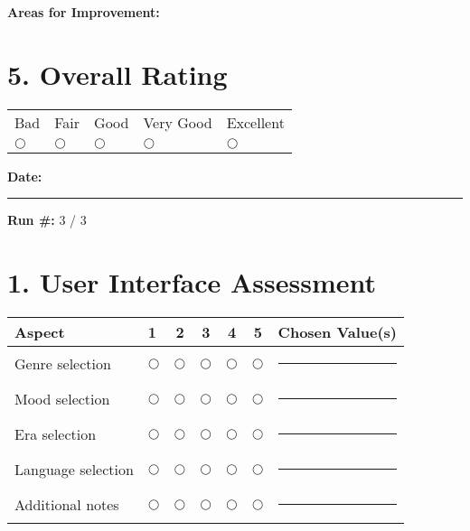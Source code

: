 \documentclass[11pt]{article}
\begin{document}
  \noindent \textbf{Areas for Improvement:}
  \vspace{2cm}

  \section*{5. Overall Rating}
  \vspace{0.5cm}
  \begin{center}
    \begin{tabular}{p{1.8cm}p{1.8cm}p{1.8cm}p{1.8cm}p{1.8cm}}
      Bad & Fair & Good & Very Good & Excellent\\
      $\bigcirc$ & $\bigcirc$ & $\bigcirc$ & $\bigcirc$ & $\bigcirc$\\
    \end{tabular}
  \end{center}


  \newpage
  \begin{center}
    \textbf{Date:} \rule{3cm}{0.15mm} \hspace{0.5cm}
    \textbf{Run \#:} 3 / 3
  \end{center}

  \vspace{0.5cm}

  \section*{1. User Interface Assessment}
  \begin{center}
    \begin{tabular}{p{5cm}lccccl}
        \textbf{Aspect} & \textbf{1} & \textbf{2} & \textbf{3} & \textbf{4} & \textbf{5} & \textbf{Chosen Value(s)}\\
        \toprule
        Genre selection & $\bigcirc$ & $\bigcirc$ & $\bigcirc$ & $\bigcirc$ & $\bigcirc$ & \rule{6cm}{0.15mm}\\
        Mood selection & $\bigcirc$ & $\bigcirc$ & $\bigcirc$ & $\bigcirc$ & $\bigcirc$ & \rule{6cm}{0.15mm}\\
        Era selection & $\bigcirc$ & $\bigcirc$ & $\bigcirc$ & $\bigcirc$ & $\bigcirc$ & \rule{6cm}{0.15mm}\\
        Language selection & $\bigcirc$ & $\bigcirc$ & $\bigcirc$ & $\bigcirc$ & $\bigcirc$ & \rule{6cm}{0.15mm}\\
        Additional notes & $\bigcirc$ & $\bigcirc$ & $\bigcirc$ & $\bigcirc$ & $\bigcirc$ & \rule{6cm}{0.15mm}\\
    \end{tabular}
  \end{center}
\end{document}
